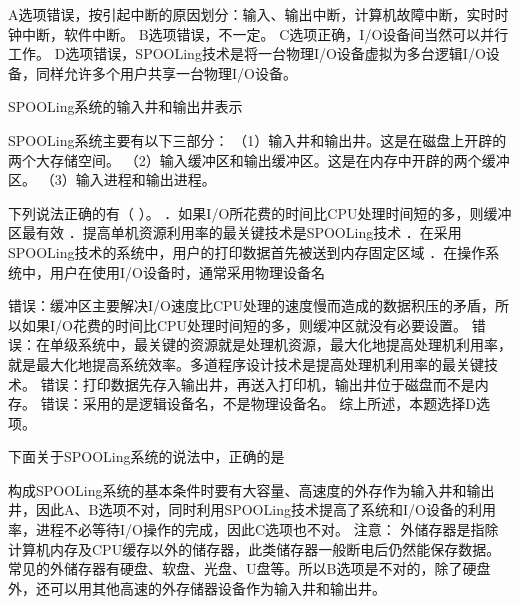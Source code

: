\begin{solution}A选项错误，按引起中断的原因划分：输入、输出中断，计算机故障中断，实时时钟中断，软件中断。
B选项错误，不一定。 C选项正确，I/O设备间当然可以并行工作。
D选项错误，SPOOLing技术是将一台物理I/O设备虚拟为多台逻辑I/O设备，同样允许多个用户共享一台物理I/O设备。
\end{solution}
\question SPOOLing系统的输入井和输出井表示
\par{}
\begin{solution}SPOOLing系统主要有以下三部分：
（1）输入井和输出井。这是在磁盘上开辟的两个大存储空间。
（2）输入缓冲区和输出缓冲区。这是在内存中开辟的两个缓冲区。
（3）输入进程和输出进程。
\end{solution}
\question 下列说法正确的有（ ）。
．如果I/O所花费的时间比CPU处理时间短的多，则缓冲区最有效
．提高单机资源利用率的最关键技术是SPOOLing技术
．在采用SPOOLing技术的系统中，用户的打印数据首先被送到内存固定区域
．在操作系统中，用户在使用I/O设备时，通常采用物理设备名
\par{}
\begin{solution}错误：缓冲区主要解决I/O速度比CPU处理的速度慢而造成的数据积压的矛盾，所以如果I/O花费的时间比CPU处理时间短的多，则缓冲区就没有必要设置。
错误：在单级系统中，最关键的资源就是处理机资源，最大化地提高处理机利用率，就是最大化地提高系统效率。多道程序设计技术是提高处理机利用率的最关键技术。
错误：打印数据先存入输出井，再送入打印机，输出井位于磁盘而不是内存。
错误：采用的是逻辑设备名，不是物理设备名。 综上所述，本题选择D选项。
\end{solution}
\question 下面关于SPOOLing系统的说法中，正确的是
\par{}
\begin{solution}构成SPOOLing系统的基本条件时要有大容量、高速度的外存作为输入井和输出井，因此A、B选项不对，同时利用SPOOLing技术提高了系统和I/O设备的利用率，进程不必等待I/O操作的完成，因此C选项也不对。
注意：
外储存器是指除计算机内存及CPU缓存以外的储存器，此类储存器一般断电后仍然能保存数据。常见的外储存器有硬盘、软盘、光盘、U盘等。所以B选项是不对的，除了硬盘外，还可以用其他高速的外存储器设备作为输入井和输出井。
\end{solution}

